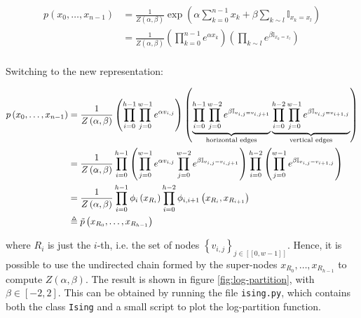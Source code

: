 \documentclass[a4paper, 11pt]{report}
\begin{document}
\begin{enumerate}[resume]
    \begin{equation*}
        \begin{aligned}
        p \left( x_0, \dots, x_{n-1} \right) &= \frac{1}{Z \left( \alpha, \beta \right)} \exp \left( \alpha \sum_{k=0}^{n-1} x_k + \beta \sum_{k \sim l} \mathbb{I}_{x_k = x_l} \right) \\
        &= \frac{1}{Z \left( \alpha, \beta \right)} \left( \prod_{k=0}^{n-1} e^{\alpha x_k} \right) \left( \prod_{k \sim l} e^{\beta \mathbb{I}_{x_k = x_l}} \right) \\
        \end{aligned}
    \end{equation*}
    
    Switching to the new representation:
    
    \begin{equation*}
        \begin{aligned}
        p \left( x_0, \dots, x_{n-1} \right) &= \frac{1}{Z \left( \alpha, \beta \right)} \left( \prod_{i=0}^{h-1} \prod_{j=0}^{w-1} e^{\alpha v_{i, j}} \right) \left( \underbrace{\prod_{i=0}^{h-1} \prod_{j=0}^{w-2} e^{\beta \mathbb{I}_{v_{i, j} = v_{i, j+1}}}}_{\text{horizontal edges}} \underbrace{\prod_{i=0}^{h-2} \prod_{j=0}^{w-1} e^{\beta \mathbb{I}_{v_{i, j} = v_{i+1, j}}}}_{\text{vertical edges}} \right) \\
        &= \frac{1}{Z \left( \alpha, \beta \right)} \prod_{i=0}^{h-1} \left( \prod_{j=0}^{w-1} e^{\alpha v_{i, j}} \prod_{j=0}^{w-2} e^{\beta \mathbb{I}_{v_{i, j} = v_{i, j+1}}} \right) \prod_{i=0}^{h-2} \left( \prod_{j=0}^{w-1} e^{\beta \mathbb{I}_{v_{i, j} = v_{i+1, j}}} \right) \\
        &= \frac{1}{Z \left( \alpha, \beta \right)} \prod_{i=0}^{h-1} \phi_{i} \left( x_{R_i} \right) \prod_{i=0}^{h-2} \phi_{i, i+1} \left( x_{R_i}, x_{R_{i+1}} \right) \\
        &\triangleq \Tilde{p} \left( x_{R_0}, \dots, x_{R_{h-1}} \right)
        \end{aligned}
    \end{equation*}

    where $R_i$ is just the $i$-th, i.e. the set of nodes $\left\{ v_{i, j} \right\}_{j \in [\![ 0, w-1 ]\!]}$. Hence, it is possible to use the undirected chain formed by the super-nodes $x_{R_0}, \dots, x_{R_{h-1}}$ to compute $Z \left( \alpha, \beta \right)$. The result is shown in figure \ref{fig:log-partition}, with $\beta \in [-2, 2]$. This can be obtained by running the file \texttt{ising.py}, which contains both the class \texttt{Ising} and a small script to plot the log-partition function.
    

\end{enumerate}
\end{document}
